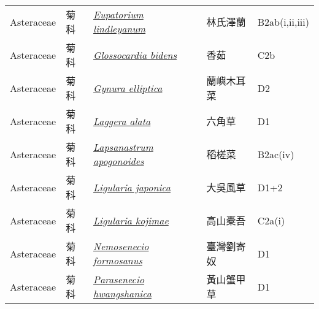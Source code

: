 {\begin{longtable}{L{2.5cm}L{2cm}L{5cm}L{2.5cm}L{3cm}}
    Asteraceae & 菊科 & \href{http://www.theplantlist.org/tpl1.1/search?q=Eupatorium+lindleyanum}{\textit{Eupatorium lindleyanum} } & 林氏澤蘭 & B2ab(i,ii,iii)    \\
    Asteraceae & 菊科 & \href{http://www.theplantlist.org/tpl1.1/search?q=Glossocardia+bidens}{\textit{Glossocardia bidens} } & 香茹 & C2b    \\
    Asteraceae & 菊科 & \href{http://www.theplantlist.org/tpl1.1/search?q=Gynura+elliptica}{\textit{Gynura elliptica} } & 蘭嶼木耳菜 & D2    \\
    Asteraceae & 菊科 & \href{http://www.theplantlist.org/tpl1.1/search?q=Laggera+alata}{\textit{Laggera alata} } & 六角草 & D1    \\
    Asteraceae & 菊科 & \href{http://www.theplantlist.org/tpl1.1/search?q=Lapsanastrum+apogonoides}{\textit{Lapsanastrum apogonoides} } & 稻槎菜 & B2ac(iv)    \\
    Asteraceae & 菊科 & \href{http://www.theplantlist.org/tpl1.1/search?q=Ligularia+japonica}{\textit{Ligularia japonica} } & 大吳風草 & D1+2    \\
    Asteraceae & 菊科 & \href{http://www.theplantlist.org/tpl1.1/search?q=Ligularia+kojimae}{\textit{Ligularia kojimae} } & 高山橐吾 & C2a(i)    \\
    Asteraceae & 菊科 & \href{http://www.theplantlist.org/tpl1.1/search?q=Nemosenecio+formosanus}{\textit{Nemosenecio formosanus} } & 臺灣劉寄奴 & D1    \\
    Asteraceae & 菊科 & \href{http://www.theplantlist.org/tpl1.1/search?q=Parasenecio+hwangshanica}{\textit{Parasenecio hwangshanica} } & 黃山蟹甲草 & D1    \\

\end{longtable}}
